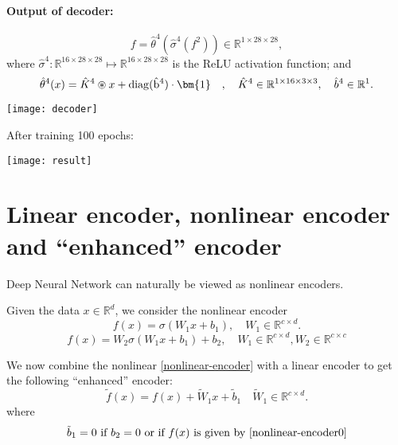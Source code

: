 \paragraph{Output of decoder:}
        \begin{equation*}
            f = \hat\theta^4 (\hat\sigma^4(f^2))\in \mathbb{R}^{1\times 28\times 28},
        \end{equation*}
            where $\hat\sigma^4: \mathbb{R}^{16\times 28\times 28}\mapsto \mathbb{R}^{16\times 28\times 28}$ is the ReLU activation function;  and
            \begin{equation*}
                \hat\theta^4(x) = \hat K^4 \circledast x + {\rm{diag}(\hat b^4) }\cdot \bm{1} \quad, \quad \hat K^4 \in \mathbb R^{1 \times 16 \times 3 \times 3}, \quad \hat b^4 \in \mathbb R^{1}.
            \end{equation*}

            \begin{center}
                \texttt{[image: decoder]}
            \end{center}
   After training 100 epochs:

    \begin{center}
        \texttt{[image: result]}
    \end{center}

\section{Linear encoder, nonlinear encoder and ``enhanced'' encoder}
Deep Neural Network can naturally be viewed as nonlinear encoders. 

Given the data $x\in \mathbb R^d$, we consider the nonlinear encoder
\begin{equation}\label{nonlinear-encoder0}
f(x)=\sigma (W_1x+b_1),  \quad W_1\in \mathbb R^{c\times d}.  
\end{equation}
\begin{equation}\label{nonlinear-encoder}
f(x)=W_2\sigma (W_1x+b_1)+b_2,  \quad W_1\in \mathbb R^{c\times d},
W_2\in\mathbb R^{c\times c}
\end{equation}

We now combine the nonlinear \eqref{nonlinear-encoder} with a linear
encoder to get the following ``enhanced'' encoder:
\begin{equation}\label{enhanced-encoder}
\tilde f(x)=f(x)+\tilde W_1x +\tilde b_1\quad \tilde W_1\in \mathbb R^{c\times d}.
\end{equation}
where
\begin{equation}
\tilde b_1=0 \mbox{ if } b_2=0 \mbox{ or if $f(x)$ is given by \eqref{nonlinear-encoder0}}
\end{equation}

